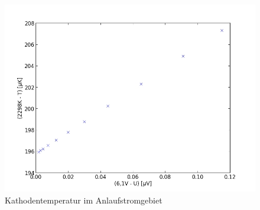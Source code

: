 	\begin{figure}[h]
		\begin{center}
		\includegraphics[scale=0.75]{picc1.jpg}
		\caption{Kathodentemperatur im Anlaufstromgebiet}
		\label{picc1}
		\end{center}	
	\end{figure}